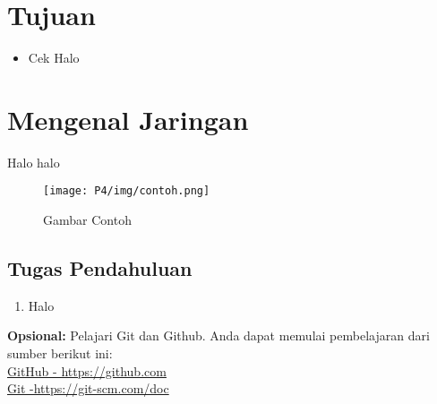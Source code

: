 \section{Tujuan}
\begin{itemize}[label=$\bullet$, itemsep=-1pt, leftmargin=*]
    \item Cek Halo
\end{itemize}

\section{Mengenal Jaringan}
Halo halo

\begin{figure}[H]
    \centering
    \texttt{[image: P4/img/contoh.png]}
    \caption{Gambar Contoh}
    \label{fig:gambarcontoh}
\end{figure}

\subsection{Tugas Pendahuluan}
\begin{enumerate}
    \item Halo
\end{enumerate}


\begin{center}
    \colorbox{cyan!30}{\parbox{0.8\linewidth}{\textbf{Opsional:} Pelajari Git dan Github. Anda dapat memulai pembelajaran dari sumber berikut ini: \\ \href{https://github.com}{GitHub - https://github.com} \\ \href{https://git-scm.com/doc}{Git -https://git-scm.com/doc}}}
\end{center}